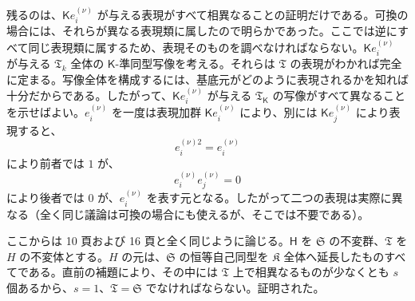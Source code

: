 残るのは、$\mathsf K e_i^{(\nu)}$ が与える表現がすべて相異なることの証明だけである。可換の場合には、それらが異なる表現類に属したので明らかであった。ここでは逆にすべて同じ表現類に属するため、表現そのものを調べなければならない。$\mathsf K e_i^{(\nu)}$ が与える $\mathfrak T_k$ 全体の $\mathsf{K}$-準同型写像を考える。それらは $\mathfrak T$ の表現がわかれば完全に定まる。写像全体を構成するには、基底元がどのように表現されるかを知れば十分だからである。したがって、$\mathsf K e_i^{(\nu)}$ が与える $\mathfrak T_{\mathsf{K}}$ の写像がすべて異なることを示せばよい。$e_i^{(\nu)}$ を一度は表現加群 $\mathsf K e_i^{(\nu)}$ により、別には $\mathsf K e_j^{(\nu)}$ により表現すると、
\[
e_i^{(\nu)2}=e_i^{(\nu)}
\]
により前者では $1$ が、
\[
e_i^{(\nu)}e_j^{(\nu)}=0
\]
により後者では $0$ が、$e_i^{(\nu)}$ を表す元となる。したがって二つの表現は実際に異なる（全く同じ議論は可換の場合にも使えるが、そこでは不要である）。

ここからは 10 頁および 16 頁と全く同じように論じる。$\mathsf{H}$ を $\mathfrak S$ の不変群、$\mathfrak T$ を $H$ の不変体とする。$H$ の元は、$\mathfrak S$ の恒等自己同型を $\mathfrak K$ 全体へ延長したものすべてである。直前の補題により、その中には $\mathfrak T$ 上で相異なるものが少なくとも $s$ 個あるから、$s=1$、$\mathfrak T=\mathfrak S$ でなければならない。証明された。

